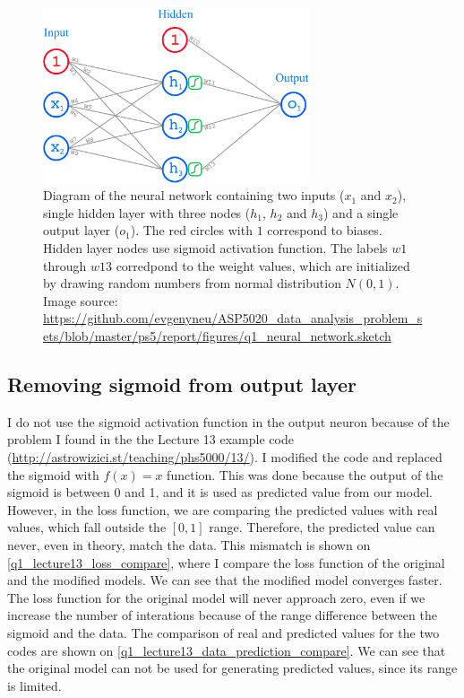 \begin{figure}[!ht]
  \centering
  \includegraphics[width=0.7\textwidth]{figures/q1_neural_network.pdf}
  \caption{Diagram of the neural network containing two inputs ($x_1$ and $x_2$), single hidden layer with three nodes ($h_1$, $h_2$ and $h_3$) and a single output layer ($o_1$). The red circles with $1$ correspond to biases. Hidden layer nodes use sigmoid activation function. The labels $w1$ through $w13$ corredpond to the weight values, which are initialized by drawing random numbers from normal distribution $N(0, 1)$. Image source: \url{https://github.com/evgenyneu/ASP5020_data_analysis_problem_sets/blob/master/ps5/report/figures/q1_neural_network.sketch}}
  \label{q1_network_diagram}
\end{figure}


\subsection*{Removing sigmoid from output layer}

I do not use the sigmoid activation function in the output neuron because of the problem I found in the the Lecture 13 example code (\url{http://astrowizici.st/teaching/phs5000/13/}). I modified the code and replaced the sigmoid with $f(x) = x$ function. This was done because the output of the sigmoid is between 0 and 1, and it is used as predicted value from our model. However, in the loss function, we are comparing the predicted values with real values, which fall outside the $[0, 1]$ range. Therefore, the predicted value can never, even in theory, match the data. This mismatch is shown on \autoref{q1_lecture13_loss_compare}, where I compare the loss function of the original and the modified models. We can see that the modified model converges faster. The loss function for the original model will never approach zero, even if we increase the number of interations because of the range difference between the sigmoid and the data. The comparison of real and predicted values for the two codes are shown on \autoref{q1_lecture13_data_prediction_compare}. We can see that the original model can not be used for generating predicted values, since its range is limited.

